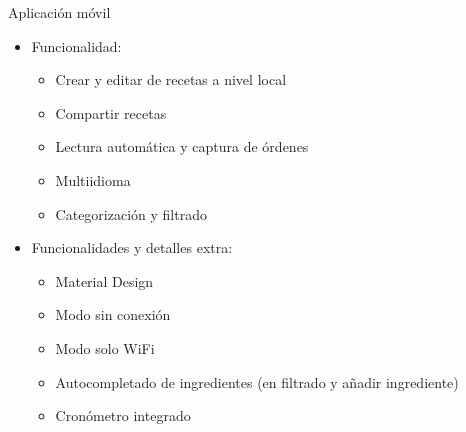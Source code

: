 \documentclass[10pt,xcolor=svgnames]{beamer}
\begin{document}
\begin{frame}{Aplicación móvil}
  \begin{itemize}
  \item Funcionalidad:
    \begin{itemize}
    \item Crear y editar de recetas a nivel local
    \item  Compartir recetas
    \item Lectura automática y captura de órdenes
    \item Multiidioma
    \item Categorización y filtrado
    \end{itemize}
  \item Funcionalidades y detalles extra:
    \begin{itemize}
    \item Material Design
    \item Modo sin conexión
    \item Modo solo WiFi
    \item Autocompletado de ingredientes (en filtrado y añadir ingrediente)
    \item Cronómetro integrado
    \end{itemize}
  \end{itemize}
\end{frame}
\end{document}
